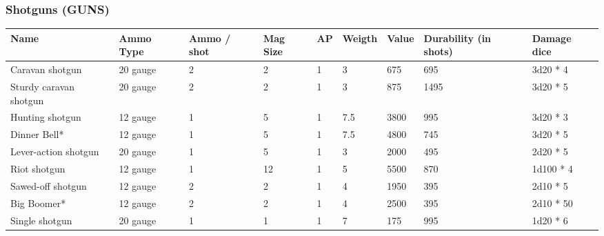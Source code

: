 
\subsubsection{Shotguns (GUNS)}
\begin{longtable}{|p{3.2cm}|p{2.4cm}|p{1.3cm}|p{.9cm}|p{0.6cm}|p{1.3cm}|p{1cm}|p{2cm}|p{3.2cm}|}
\hline
\bfseries Name & \bfseries Ammo Type & \bfseries Ammo / shot & \bfseries Mag Size & \bfseries AP & \bfseries Weigth & \bfseries Value & \bfseries Durability (in shots) & \bfseries Damage dice \\
\hline
Caravan shotgun & 20 gauge & 2 & 2 & 1 & 3 & 675 & 695 & 3d20 *  4 \\
Sturdy caravan shotgun & 20 gauge & 2 & 2 & 1 & 3 & 875 & 1495 & 3d20 *  5 \\
Hunting shotgun & 12 gauge & 1 & 5 & 1 & 7.5  & 3800 & 995 & 3d20 *  3 \\
Dinner Bell* & 12 gauge & 1 & 5 & 1 & 7.5  & 4800 & 745 & 3d20 * 5 \\
Lever-action shotgun & 20 gauge & 1 & 5 & 1 & 3 & 2000 & 495 & 2d20 *  5 \\
Riot shotgun & 12 gauge & 1 & 12 & 1 & 5 & 5500 & 870 & 1d100 *  4 \\
Sawed-off shotgun & 12 gauge & 2 & 2 & 1 & 4 & 1950 & 395 & 2d10 *  5 \\
Big Boomer* & 12 gauge & 2 & 2 & 1 & 4 & 2500 & 395 & 2d10 *  50 \\
Single shotgun & 20 gauge & 1 & 1 & 1 & 7 & 175 & 995 & 1d20 *  6 \\
\hline
\end{longtable}
